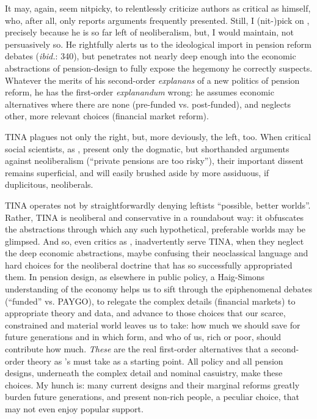 \documentclass[11pt,a4paper,oneside,openright]{article}
\begin{document}
It may, again, seem nitpicky, to relentlessly criticize authors as critical as \cite{Cerami2009a} himself, who, after all, only reports arguments frequently presented. 
Still, I (nit-)pick on \citeauthor{Cerami2009a}, precisely because he is so far left of neoliberalism, but, I would maintain, not persuasively so. 
He rightfully alerts us to the ideological import in pension reform debates (\emph{ibid.}: 340), but penetrates not nearly deep enough into the economic abstractions of pension-design to fully expose the hegemony he correctly suspects. 
Whatever the merits of his second-order \emph{explanans} of a new politics of pension reform, he has the first-order \emph{explanandum} wrong: 
he assumes economic alternatives where there are none (pre-funded vs. post-funded), and neglects other, more relevant choices (financial market reform). 

TINA plagues not only the right, but, more deviously, the left, too. 
When critical social scientists, as \cite{Cerami2009a}, present only the dogmatic, but shorthanded arguments against neoliberalism (``private pensions are too risky''), their important dissent remains superficial, and will easily brushed aside by more assiduous, if duplicitous, neoliberals. 

TINA operates not by straightforwardly denying leftists ``possible, better worlds''. 
Rather, TINA is neoliberal and conservative in a roundabout way: 
it obfuscates the abstractions through which any such hypothetical, preferable worlds may be glimpsed. 
And so, even critics as \citeauthor{Cerami2009a}, inadvertently serve TINA, when they neglect the deep economic abstractions, maybe confusing their neoclassical language and hard choices for the neoliberal doctrine that has so successfully appropriated them. 
In pension design, as elsewhere in public policy, a Haig-Simons understanding of the economy helps us to sift through the epiphenomenal debates (``funded'' vs. PAYGO), to relegate the complex details (financial markets) to appropriate theory and data, and advance to those choices that our scarce, constrained and material world leaves us to take: 
how much we should save for future generations and in which form, and who of us, rich or poor, should contribute how much. 
\emph{These} are the real first-order alternatives that a second-order theory as \citeauthor{Cerami2009a}'s must take as a starting point. 
All policy and all pension designs, underneath the complex detail and nominal casuistry, make these choices. 
My hunch is: 
many  current designs and their marginal reforms greatly burden future generations, and present non-rich people, a peculiar choice, that may not even enjoy popular support. 
\end{document}

